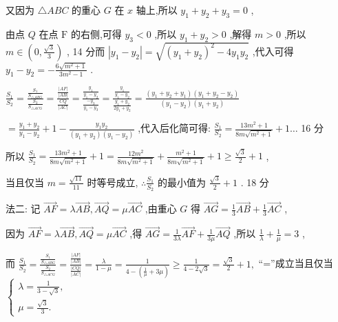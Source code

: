 \documentclass[10pt]{article}
\begin{document}
又因为 \(\bigtriangleup {ABC}\) 的重心 \(G\) 在 \(x\) 轴上,所以 \({y}_{1} + {y}_{2} + {y}_{3} = 0\) ,

由点 \(Q\) 在点 \(\mathrm{F}\) 的右侧,可得 \({y}_{3} < 0\) ,所以 \({y}_{1} + {y}_{2} > 0\) ,解得 \(m > 0\) ,所以 \(m \in  \left( {0,\frac{\sqrt{3}}{3}}\right)\) , 14 分而 \(\left| {{y}_{1} - {y}_{2}}\right|  = \sqrt{{\left( {y}_{1} + {y}_{2}\right) }^{2} - 4{y}_{1}{y}_{2}}\) ,代入可得 \({y}_{1} - {y}_{2} =  - \frac{6\sqrt{{m}^{2} + 1}}{3{m}^{2} - 1}\) .

\(\frac{{S}_{1}}{{S}_{2}} = \frac{\frac{{S}_{1}}{{S}_{\bigtriangleup {ABG}}}}{\frac{{S}_{2}}{{S}_{\bigtriangleup {ACG}}}} = \frac{\frac{\left| AF\right| }{\left| AB\right| }}{\frac{CQ}{\left| AC\right| }} = \frac{\frac{{y}_{1}}{{y}_{1} - {y}_{2}}}{\frac{-{y}_{3}}{{y}_{1} - {y}_{3}}} = \frac{\frac{{y}_{1}}{{y}_{1} - {y}_{2}}}{\frac{{y}_{1} + {y}_{2}}{2{y}_{1} + {y}_{2}}} = \frac{\left( {{y}_{1} + {y}_{2} + {y}_{1}}\right) \left( {{y}_{1} + {y}_{2} - {y}_{2}}\right) }{\left( {{y}_{1} - {y}_{2}}\right) \left( {{y}_{1} + {y}_{2}}\right) }\)

\(= \frac{{y}_{1} + {y}_{2}}{{y}_{1} - {y}_{2}} + 1 - \frac{{y}_{1}{y}_{2}}{\left( {{y}_{1} + {y}_{2}}\right) \left( {{y}_{1} - {y}_{2}}\right) }\) ,代入后化简可得: \(\frac{{S}_{1}}{{S}_{2}} = \frac{{13}{m}^{2} + 1}{{8m}\sqrt{{m}^{2} + 1}} + 1\ldots\) 16 分

所以 \(\frac{{S}_{1}}{{S}_{2}} = \frac{{13}{m}^{2} + 1}{{8m}\sqrt{{m}^{2} + 1}} + 1 = \frac{{12}{m}^{2}}{{8m}\sqrt{{m}^{2} + 1}} + \frac{{m}^{2} + 1}{{8m}\sqrt{{m}^{2} + 1}} + 1 \geq  \frac{\sqrt{3}}{2} + 1\) ,

当且仅当 \(m = \frac{\sqrt{11}}{11}\) 时等号成立, \(\therefore \frac{{S}_{1}}{{S}_{2}}\) 的最小值为 \(\frac{\sqrt{3}}{2} + 1\) . 18 分

法二: 记 \(\overrightarrow{AF} = \lambda \overrightarrow{AB},\overrightarrow{AQ} = \mu \overrightarrow{AC}\) ,由重心 \(G\) 得 \(\overrightarrow{AG} = \frac{1}{3}\overrightarrow{AB} + \frac{1}{3}\overrightarrow{AC}\) ,

因为 \(\overrightarrow{AF} = \lambda \overrightarrow{AB},\overrightarrow{AQ} = \mu \overrightarrow{AC}\) ,得 \(\overrightarrow{AG} = \frac{1}{3\lambda }\overrightarrow{AF} + \frac{1}{3\mu }\overrightarrow{AQ}\) ,所以 \(\frac{1}{\lambda } + \frac{1}{\mu } = 3\) ,

而 \(\frac{{S}_{1}}{{S}_{2}} = \frac{\frac{{S}_{1}}{{S}_{\bigtriangleup {ABG}}}}{\frac{{S}_{2}}{{S}_{\bigtriangleup {ACG}}}} = \frac{\frac{\left| AF\right| }{\left| AB\right| }}{\frac{\left| CQ\right| }{\left| AC\right| }} = \frac{\lambda }{1 - \mu } = \frac{1}{4 - \left( {\frac{1}{\mu } + {3\mu }}\right) } \geq  \frac{1}{4 - 2\sqrt{3}} = \frac{\sqrt{3}}{2} + 1,\) “=”成立当且仅当 \(\left\{  \begin{array}{l} \lambda  = \frac{1}{3 - \sqrt{3}}, \\  \mu  = \frac{\sqrt{3}}{3}. \end{array}\right.\)
\end{document}
